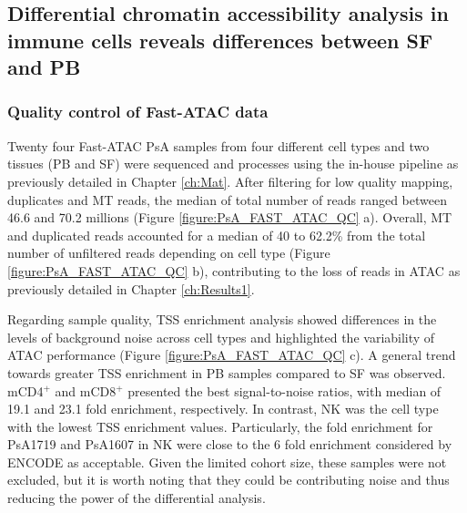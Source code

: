 \subsection{Differential chromatin accessibility analysis in immune cells reveals differences between SF and PB}

\subsubsection{Quality control of Fast-ATAC data}
Twenty four Fast-ATAC PsA samples from four different cell types and two tissues (PB and SF) were sequenced and processes using the in-house pipeline as previously detailed in Chapter \ref{ch:Mat}. After filtering for low quality mapping, duplicates and MT reads, the median of total number of reads ranged between 46.6 and 70.2 millions (Figure \ref{figure:PsA_FAST_ATAC_QC} a). Overall, MT and duplicated reads accounted for a median of 40 to 62.2\% from the total number of unfiltered reads depending on cell type (Figure \ref{figure:PsA_FAST_ATAC_QC} b), contributing to the loss of reads in ATAC as previously detailed in Chapter \ref{ch:Results1}. %

Regarding sample quality, TSS enrichment analysis showed differences in the levels of background noise across cell types and highlighted the variability of ATAC performance (Figure \ref{figure:PsA_FAST_ATAC_QC} c). A general trend towards greater TSS enrichment in PB samples compared to SF was observed. mCD4$^+$ and mCD8$^+$ presented the best signal-to-noise ratios, with median of 19.1 and 23.1 fold enrichment, respectively. In contrast, NK was the cell type with the lowest TSS enrichment values. Particularly, the fold enrichment for PsA1719 and PsA1607 in NK were close to the 6 fold enrichment considered by ENCODE as acceptable. Given the limited cohort size, these samples were not excluded, but it is worth noting that they could be contributing noise and thus reducing the power of the differential analysis.

